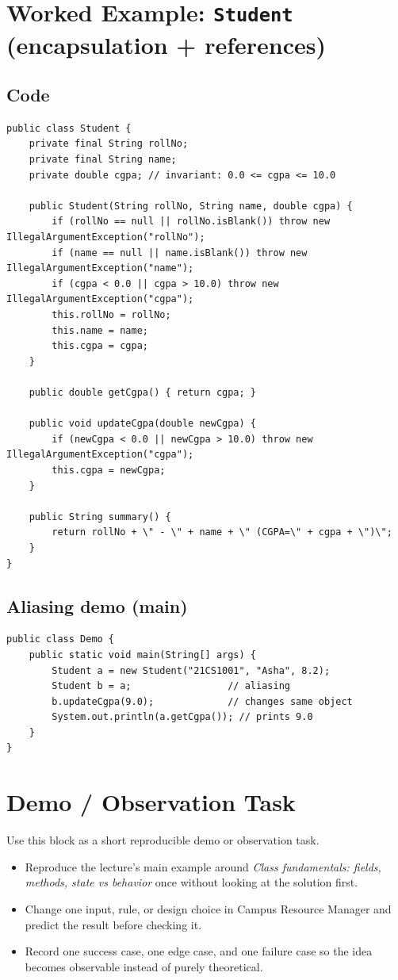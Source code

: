 \documentclass[11pt]{article}
\begin{document}
\section{Worked Example: \texttt{Student} (encapsulation + references)}
\subsection*{Code}
\begin{lstlisting}
public class Student {
    private final String rollNo;
    private final String name;
    private double cgpa; // invariant: 0.0 <= cgpa <= 10.0

    public Student(String rollNo, String name, double cgpa) {
        if (rollNo == null || rollNo.isBlank()) throw new IllegalArgumentException("rollNo");
        if (name == null || name.isBlank()) throw new IllegalArgumentException("name");
        if (cgpa < 0.0 || cgpa > 10.0) throw new IllegalArgumentException("cgpa");
        this.rollNo = rollNo;
        this.name = name;
        this.cgpa = cgpa;
    }

    public double getCgpa() { return cgpa; }

    public void updateCgpa(double newCgpa) {
        if (newCgpa < 0.0 || newCgpa > 10.0) throw new IllegalArgumentException("cgpa");
        this.cgpa = newCgpa;
    }

    public String summary() {
        return rollNo + \" - \" + name + \" (CGPA=\" + cgpa + \")\";
    }
}
\end{lstlisting}

\subsection*{Aliasing demo (main)}
\begin{lstlisting}
public class Demo {
    public static void main(String[] args) {
        Student a = new Student("21CS1001", "Asha", 8.2);
        Student b = a;                 // aliasing
        b.updateCgpa(9.0);             // changes same object
        System.out.println(a.getCgpa()); // prints 9.0
    }
}
\end{lstlisting}

\section{Demo / Observation Task}
Use this block as a short reproducible demo or observation task.
\begin{itemize}
  \item Reproduce the lecture's main example around \textit{Class fundamentals: fields, methods, state vs behavior} once without looking at the solution first.
  \item Change one input, rule, or design choice in Campus Resource Manager and predict the result before checking it.
  \item Record one success case, one edge case, and one failure case so the idea becomes observable instead of purely theoretical.
\end{itemize}
\notesources{\OOPSUnitIISources}
\end{document}
